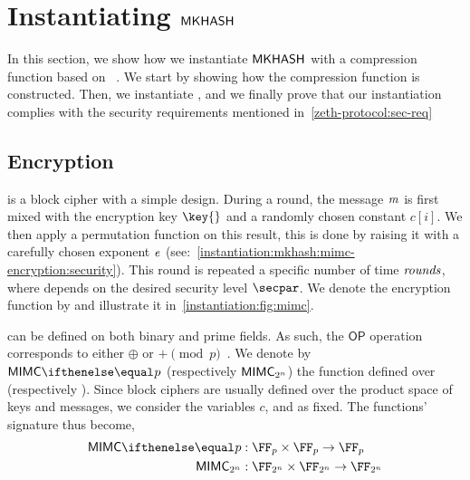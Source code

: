 
\section{Instantiating $\mathsf{MKHASH}$}\label{instantiation:mkhash}

In this section, we show how we instantiate $\mathsf{MKHASH}$ with a compression function based on \mimc{}~\cite{albrecht2016mimc}. We start by showing how the compression function is constructed. Then, we instantiate \mkhash, and we finally prove that our instantiation complies with the security requirements mentioned in~\cref{zeth-protocol:sec-req}

\subsection{\mimc{} Encryption}\label{instantiation:mkhash:mimc-encryption}

\mimc{} is a block cipher with a simple design. During a round, the message $\mathit{m}$ is first mixed with the encryption key $\key{}$ and a randomly chosen constant $c[i]$. We then apply a permutation function on this result, this is done by raising it with a carefully chosen exponent $\mathit{e}{}$ (see:~\cref{instantiation:mkhash:mimc-encryption:security}). This round is repeated a specific number of time $\mathit{rounds}$, where \rounds{} depends on the desired security level $\secpar$. We denote the encryption function by \mimcEnc{} and illustrate it in~\cref{instantiation:fig:mimc}.

\begin{figure*}[ht]
    \centering
    \caption{\mimc{} Encryption function.}\label{instantiation:fig:mimc}
\end{figure*}

\mimcEnc{} can be defined on both binary and prime fields. As such, the $\mathsf{OP}$ operation corresponds to either $\oplus$ or $+ \pmod{p}$~\cite{albrecht2016mimc, grassi2016mpc}. We denote by $\mimcPrime{p}$ (respectively $\mathsf{MIMC{}}_{2^n}$) the \mimcEnc{} function defined over  (respectively ). Since block ciphers are usually defined over the product space of keys and messages, we consider the variables $c$, \rounds{} and \exponent{} as fixed. The functions' signature thus become,
\begin{align*}
    \mimcPrime{p} &: \FFx{p} \times \FFx{p} \to \FFx{p} \\
    \mimc{}_{2^n} &: \FFx{2^n} \times \FFx{2^n} \to \FFx{2^n}
\end{align*}

